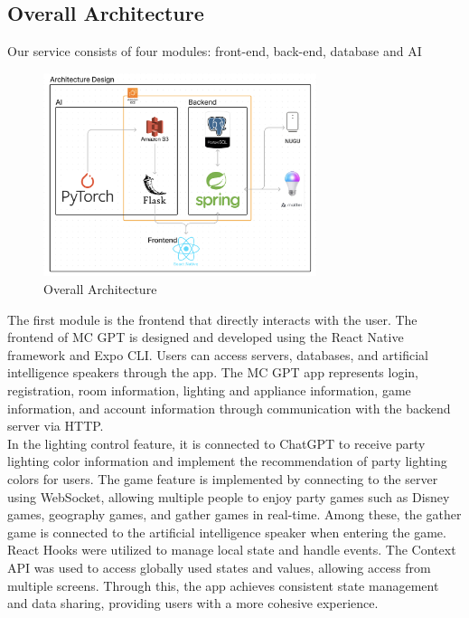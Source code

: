 \documentclass[conference]{IEEEtran}
\begin{document}
    \subsection{Overall Architecture}
        Our service consists of four modules: front-end, back-end, database and AI
            \begin{figure}[htbp]
                \centerline{\includegraphics[width = 8cm]{Images/archi/overall.png}}
                \label{fig}
                \caption{Overall Architecture}
            \end{figure}
            The first module is the frontend that directly interacts with the user. The frontend of MC GPT is designed and developed using the React Native framework and Expo CLI. Users can access servers, databases, and artificial intelligence speakers through the app. The MC GPT app represents login, registration, room information, lighting and appliance information, game information, and account information through communication with the backend server via HTTP.\\
            In the lighting control feature, it is connected to ChatGPT to receive party lighting color information and implement the recommendation of party lighting colors for users. The game feature is implemented by connecting to the server using WebSocket, allowing multiple people to enjoy party games such as Disney games, geography games, and gather games in real-time. Among these, the gather game is connected to the artificial intelligence speaker when entering the game.\\
            React Hooks were utilized to manage local state and handle events. The Context API was used to access globally used states and values, allowing access from multiple screens. Through this, the app achieves consistent state management and data sharing, providing users with a more cohesive experience.\\
\end{document}
